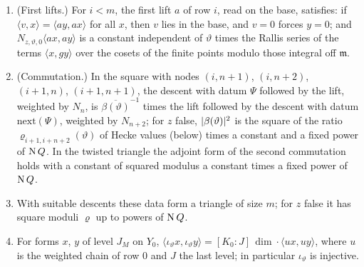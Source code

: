 \begin{proposition}\label{prop:theta-triangle}
\begin{enumerate}[label=\textup{(\alph*)}]
\item (First lifts.) For $i<m$, the first lift $a$ of row $i$, read on the base, satisfies: if $\langle v,x\rangle=\langle ay,ax\rangle$ for all $x$, then $v$ lies in the base, and $v=0$ forces $y=0$; and
$N_{z,\vartheta,0}\langle ax,ay\rangle$ is a constant independent of $\vartheta$ times the Rallis series of the terms $\langle x,gy\rangle$ over the cosets of the finite points modulo those integral off $\mathfrak m$.
\item (Commutation.) In the square with nodes $(i,n+1)$, $(i,n+2)$, $(i+1,n)$, $(i+1,n+1)$, the descent with datum $\Psi$ followed by the lift, weighted by $N_n$, is $\overline{\beta(\vartheta)}^{-1}$ times the lift
followed by the descent with datum $\mathrm{next}(\Psi)$, weighted by $N_{n+2}$; for $z$ false, $\lvert \beta(\vartheta)\rvert^2$ is the square of the ratio $\varrho_{i+1,i+n+2}(\vartheta)$ of Hecke values (below) times a constant and a
fixed power of $\operatorname{N} Q$. In the twisted triangle the adjoint form of the second commutation holds with a constant of squared modulus a constant times a fixed power of $\operatorname{N} Q$.
\item With suitable descents these data form a triangle of size $m$; for $z$ false it has square moduli $\varrho$ up to powers of $\operatorname{N} Q$.
\item For forms $x$, $y$ of level $J_M$ on $Y_0$, $\langle\iota_\vartheta x,\iota_\vartheta y\rangle=[K_0:J]\,\dim\cdot\langle ux,uy\rangle$, where $u$ is the weighted chain of row $0$ and $J$ the last level; in particular $\iota_\vartheta$ is
injective.
\end{enumerate}
\end{proposition}

